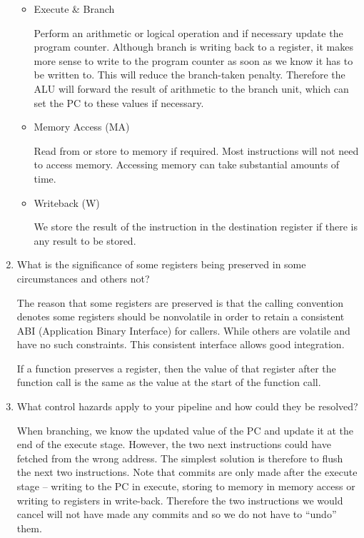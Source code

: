 \documentclass[10pt,\jkfside,a4paper]{article}
\begin{document}
\begin{enumerate}
\begin{itemize}
\item Execute \& Branch

Perform an arithmetic or logical operation and if necessary update the
program counter. Although branch is writing back to a register, it makes
more sense to write to the program counter as soon as we know it has to be
written to. This will reduce the branch-taken penalty. Therefore the ALU
will forward the result of arithmetic to the branch unit, which can set the
PC to these values if necessary.

\item Memory Access (MA)

Read from or store to memory if required. Most instructions will not need to
access memory. Accessing memory can take substantial amounts of time.

\item Writeback (W)

We store the result of the instruction in the destination register if there
is any result to be stored.

\end{itemize}

\item What is the significance of some registers being preserved in some
circumstances and others not?

The reason that some registers are preserved is that the calling convention
denotes some registers should be nonvolatile in order to retain a consistent
ABI (Application Binary Interface) for callers. While others are volatile and
have no such constraints. This consistent interface allows good integration.

If a function preserves a register, then the value of that register after
the function call is the same as the value at the start of the function call.

\item What control hazards apply to your pipeline and how could they be
resolved?

When branching, we know the updated value of the PC and update it at the end
of the execute stage. However, the two next instructions could have fetched
from the wrong address. The simplest solution is therefore to flush the next
two instructions. Note that commits are only made after the execute stage --
writing to the PC in execute, storing to memory in memory access or writing
to registers in write-back. Therefore the two instructions we would cancel
will not have made any commits and so we do not have to ``undo'' them.


\end{enumerate}
\end{document}
